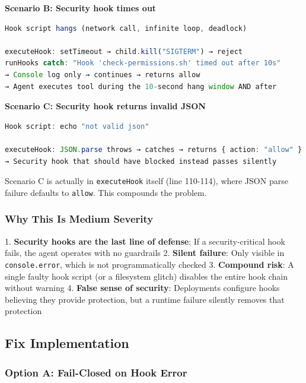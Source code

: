 \textbf{Scenario B: Security hook times out}



\begin{lstlisting}[language=TypeScript]
Hook script hangs (network call, infinite loop, deadlock)

executeHook: setTimeout → child.kill("SIGTERM") → reject
runHooks catch: "Hook 'check-permissions.sh' timed out after 10s"
→ Console log only → continues → returns allow
→ Agent executes tool during the 10-second hang window AND after

\end{lstlisting}



\textbf{Scenario C: Security hook returns invalid JSON}



\begin{lstlisting}[language=TypeScript]
Hook script: echo "not valid json"

executeHook: JSON.parse throws → catches → returns { action: "allow" }
→ Security hook that should have blocked instead passes silently

\end{lstlisting}



Scenario C is actually in \texttt{executeHook} itself (line 110-114), where JSON parse failure defaults to \texttt{allow}. This compounds the problem.

\subsubsection*{Why This Is Medium Severity}

1. \textbf{Security hooks are the last line of defense}: If a security-critical hook fails, the agent operates with no guardrails
2. \textbf{Silent failure}: Only visible in \texttt{console.error}, which is not programmatically checked
3. \textbf{Compound risk}: A single faulty hook script (or a filesystem glitch) disables the entire hook chain without warning
4. \textbf{False sense of security}: Deployments configure hooks believing they provide protection, but a runtime failure silently removes that protection


\subsection*{Fix Implementation}
\subsubsection*{Option A: Fail-Closed on Hook Error}

